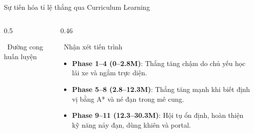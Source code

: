 \documentclass[aspectratio=169, 11pt]{beamer}
\begin{document}
\begin{frame}{Sự tiến hóa tỉ lệ thắng qua Curriculum Learning}
  \begin{columns}[T]
    \begin{column}{0.5\textwidth}
      \begin{block}{\faChartLine~Đường cong huấn luyện}
        \centering
      \end{block}
    \end{column}
    \begin{column}{0.46\textwidth}
      \begin{block}{\faCheckCircle~Nhận xét tiến trình}
        \small
        \begin{itemize}
          \item \textbf{Phase 1--4 (0--2.8M)}: Thắng tăng chậm do chủ yếu học lái xe và ngắm trực diện.
          \item \textbf{Phase 5--8 (2.8--12.3M)}: Thắng tăng mạnh khi biết định vị bằng A* và né đạn trong mê cung.
          \item \textbf{Phase 9--11 (12.3--30.3M)}: Hội tụ ổn định, hoàn thiện kỹ năng nảy đạn, dùng khiên và portal.
        \end{itemize}
      \end{block}
    \end{column}
  \end{columns}
\end{frame}


\end{document}
